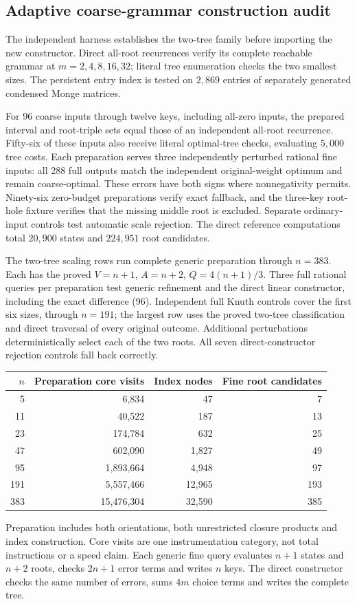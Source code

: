 \documentclass[11pt]{article}
\begin{document}
\subsection{Adaptive coarse-grammar construction audit}
\label{app:adaptive-coarse-grammar}
The independent harness establishes the two-tree family before importing
the new constructor. Direct all-root recurrences verify its complete
reachable grammar at $m=2,4,8,16,32$; literal tree enumeration checks
the two smallest sizes. The persistent entry index is tested on
$2{,}869$ entries of separately generated condensed Monge matrices.

For 96 coarse inputs through twelve keys, including all-zero inputs,
the prepared interval and root-triple sets equal those of an independent
all-root recurrence. Fifty-six of these inputs also receive literal
optimal-tree checks, evaluating $5{,}000$ tree costs. Each preparation
serves three independently perturbed rational fine inputs: all 288 full
outputs match the independent original-weight optimum and remain
coarse-optimal. These errors have both signs where nonnegativity permits.
Ninety-six zero-budget preparations verify exact fallback, and the
three-key root-hole fixture verifies that the missing middle root is
excluded. Separate ordinary-input controls test automatic scale rejection.
The direct reference computations total $20{,}900$ states and
$224{,}951$ root candidates.

The two-tree scaling rows run complete generic preparation through
$n=383$. Each has the proved $V=n+1$, $A=n+2$, $Q=4(n+1)/3$.
Three full rational queries per preparation test generic refinement
and the direct linear constructor, including the exact difference
(96). Independent full Knuth controls cover
the first six sizes, through $n=191$; the largest row uses the proved
two-tree classification and direct traversal of every original outcome.
Additional perturbations deterministically select each of the two roots.
All seven direct-constructor rejection controls fall back correctly.

\begin{center}
\begin{tabular}{rrrr}
\toprule
$n$ & Preparation core visits & Index nodes & Fine root candidates\\
\midrule
5 & 6,834 & 47 & 7\\
11 & 40,522 & 187 & 13\\
23 & 174,784 & 632 & 25\\
47 & 602,090 & 1,827 & 49\\
95 & 1,893,664 & 4,948 & 97\\
191 & 5,557,466 & 12,965 & 193\\
383 & 15,476,304 & 32,590 & 385\\
\bottomrule
\end{tabular}
\end{center}
Preparation includes both orientations, both unrestricted closure products
and index construction. Core visits are one instrumentation category,
not total instructions or a speed claim. Each generic fine query evaluates
$n+1$ states and $n+2$ roots, checks $2n+1$ error terms and writes $n$
keys. The direct constructor checks the same number of errors, sums
$4m$ choice terms and writes the complete tree.
\end{document}
